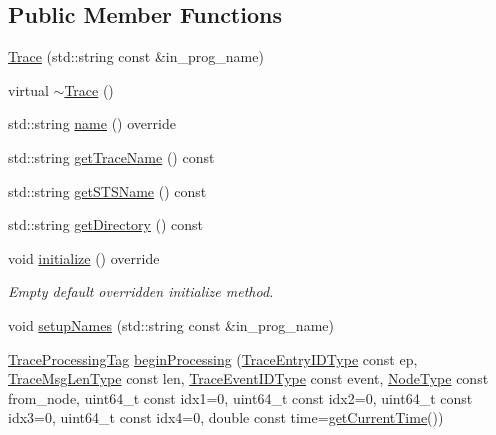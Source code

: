 \subsection*{Public Member Functions}
\begin{DoxyCompactItemize}
\item 
\hyperlink{structvt_1_1trace_1_1_trace_a2b736f560ee446cbd84aaf96e25c8d0b}{Trace} (std\+::string const \&in\+\_\+prog\+\_\+name)
\item 
virtual \hyperlink{structvt_1_1trace_1_1_trace_a80b3426aed07572525ef4834b0c4dedd}{$\sim$\+Trace} ()
\item 
std\+::string \hyperlink{structvt_1_1trace_1_1_trace_aaae4bbf6d009229a5c8b9db67a127942}{name} () override
\item 
std\+::string \hyperlink{structvt_1_1trace_1_1_trace_a6825144c1fb635304c957dee8f667b4a}{get\+Trace\+Name} () const
\item 
std\+::string \hyperlink{structvt_1_1trace_1_1_trace_af92da7879adc530c72945530b0bfa11d}{get\+S\+T\+S\+Name} () const
\item 
std\+::string \hyperlink{structvt_1_1trace_1_1_trace_ae2e8213035c557a769cf0fd1a41533a5}{get\+Directory} () const
\item 
void \hyperlink{structvt_1_1trace_1_1_trace_a24019edd964c0a307008f8d6a0f1f825}{initialize} () override
\begin{DoxyCompactList}\small\item\em Empty default overridden initialize method. \end{DoxyCompactList}\item 
void \hyperlink{structvt_1_1trace_1_1_trace_a52cc4e12a7159cf21d8893b961834af8}{setup\+Names} (std\+::string const \&in\+\_\+prog\+\_\+name)
\item 
\hyperlink{structvt_1_1trace_1_1_trace_processing_tag}{Trace\+Processing\+Tag} \hyperlink{structvt_1_1trace_1_1_trace_a8f1a745228757b9d2ece4cd226d9540c}{begin\+Processing} (\hyperlink{namespacevt_1_1trace_a3c14050715ba9eceaeff51fb3de64f2f}{Trace\+Entry\+I\+D\+Type} const ep, \hyperlink{namespacevt_1_1trace_aeb598f45d67d41db7902e494f2f0ce59}{Trace\+Msg\+Len\+Type} const len, \hyperlink{namespacevt_1_1trace_a64a7185f3e102df8d8258f263ccd1582}{Trace\+Event\+I\+D\+Type} const event, \hyperlink{namespacevt_a866da9d0efc19c0a1ce79e9e492f47e2}{Node\+Type} const from\+\_\+node, uint64\+\_\+t const idx1=0, uint64\+\_\+t const idx2=0, uint64\+\_\+t const idx3=0, uint64\+\_\+t const idx4=0, double const time=\hyperlink{structvt_1_1trace_1_1_trace_a04cf6b76b4ced1bc90d246a34c948db5}{get\+Current\+Time}())

\end{DoxyCompactItemize}
